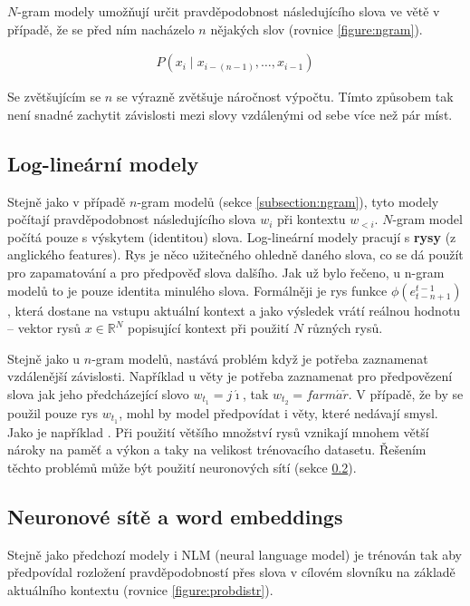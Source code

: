 $N$-gram modely umožňují určit pravděpodobnost následujícího slova ve větě v případě, že se před ním nacházelo $n$ nějakých slov (rovnice \ref{figure:ngram}).

\begin{align}\label{figure:ngram}
    P(x_{i}\mid x_{{i-(n-1)}},\dots ,x_{{i-1}})
\end{align}

Se zvětšujícím se $n$ se výrazně zvětšuje náročnost výpočtu. Tímto způsobem tak není snadné zachytit závislosti mezi slovy vzdálenými od sebe více než pár míst.

\subsection{Log-lineární modely} \label{subsection:loglinear}
Stejně jako v případě $n$-gram modelů (sekce \ref{subsection:ngram}), tyto modely počítají pravděpodobnost následujícího slova $w_i$ při kontextu $w_{<i}$. $N$-gram model počítá pouze s výskytem (identitou) slova. Log-lineární modely pracují s \textbf{rysy} (z anglického features). Rys je něco užitečného ohledně daného slova, co se dá použít pro zapamatování a pro předpověď slova dalšího. Jak už bylo řečeno, u n-gram modelů to je pouze identita minulého slova. Formálněji je rys funkce $\phi(e^{t-1}_{t-n+1})$, která dostane na vstupu aktuální kontext a jako výsledek vrátí reálnou hodnotu -- vektor rysů $x \in \mathbb{R}^N$ popisující kontext při použití $N$ různých rysů.

Stejně jako u $n$-gram modelů, nastává problém když je potřeba zaznamenat vzdálenější závislosti. Například u věty  je potřeba zaznamenat pro předpovězení slova  jak jeho předcházející slovo $w_{t_1}=j\acute{\imath}$, tak $w_{t_2}=farm\acute{a}\check{r}$. V případě, že by se použil pouze rys $w_{t_1}$, mohl by model předpovídat i věty, které nedávají smysl. Jako je například . Při použití většího množství rysů vznikají mnohem větší nároky na paměť a výkon a taky na velikost trénovacího datasetu. Řešením těchto problémů může být použití neuronových sítí (sekce \ref{subsection:neuralembeddings}).


\subsection{Neuronové sítě a word embeddings}\label{subsection:neuralembeddings}
Stejně jako předchozí modely i NLM (neural language model) je trénován tak aby předpovídal rozložení pravděpodobností přes slova v cílovém slovníku na základě aktuálního kontextu (rovnice \ref{figure:probdistr}).

